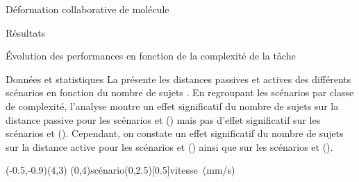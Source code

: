 \documentclass[myfrancais,ngerman,english,frenchb]{mythesis}
\begin{document}
\begin{mychapter}{Déformation collaborative de molécule}
\begin{mysection}{Résultats}
\begin{mysubsection}{Évolution des performances en fonction de la complexité de la tâche}
\begin{mysubsubsection}{Données et statistiques}
					La  présente les distances passives  et actives  des différents scénarios  en fonction du nombre de sujets .
					En regroupant les scénarios par classe de complexité, l'analyse montre un effet significatif du nombre de sujets  sur la distance passive  pour les scénarios  et  () mais pas d'effet significatif sur les scénarios  et  ().
					Cependant, on constate un effet significatif du nombre de sujets  sur la distance active  pour les scénarios  et  () ainsi que sur les scénarios  et  ().

					\begin{myfigure}
						\begin{myps}(-0.5,-0.9)(4,3)
							\myaxes(0,4){scénario}(0,2.5)[0.5]{vitesse~(mm/s)}
						\end{myps}
					\end{myfigure}


\end{mysubsubsection}
\end{mysubsection}
\end{mysection}
\end{mychapter}
\end{document}
